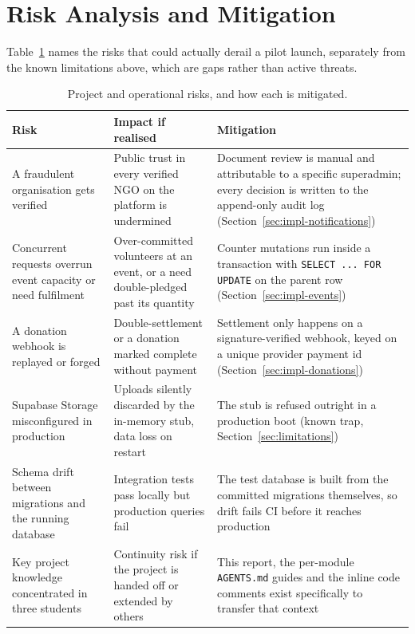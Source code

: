 \section{Risk Analysis and Mitigation}
\label{sec:risks}
Table~\ref{tab:risks} names the risks that could actually derail a pilot launch, separately from the known limitations above, which are gaps rather than active threats.

\begin{table}[H]\centering
\caption{Project and operational risks, and how each is mitigated.}
\label{tab:risks}
\begin{tabularx}{\textwidth}{|p{}|p{}|X|}
\hline
\textbf{Risk} & \textbf{Impact if realised} & \textbf{Mitigation}\\\hline
A fraudulent organisation gets verified & Public trust in every verified NGO on the platform is undermined & Document review is manual and attributable to a specific superadmin; every decision is written to the append-only audit log (Section~\ref{sec:impl-notifications})\\\hline
Concurrent requests overrun event capacity or need fulfilment & Over-committed volunteers at an event, or a need double-pledged past its quantity & Counter mutations run inside a transaction with \texttt{SELECT ... FOR UPDATE} on the parent row (Section~\ref{sec:impl-events})\\\hline
A donation webhook is replayed or forged & Double-settlement or a donation marked complete without payment & Settlement only happens on a signature-verified webhook, keyed on a unique provider payment id (Section~\ref{sec:impl-donations})\\\hline
Supabase Storage misconfigured in production & Uploads silently discarded by the in-memory stub, data loss on restart & The stub is refused outright in a production boot (known trap, Section~\ref{sec:limitations})\\\hline
Schema drift between migrations and the running database & Integration tests pass locally but production queries fail & The test database is built from the committed migrations themselves, so drift fails CI before it reaches production\\\hline
Key project knowledge concentrated in three students & Continuity risk if the project is handed off or extended by others & This report, the per-module \texttt{AGENTS.md} guides and the inline code comments exist specifically to transfer that context\\\hline
\end{tabularx}
\end{table}

